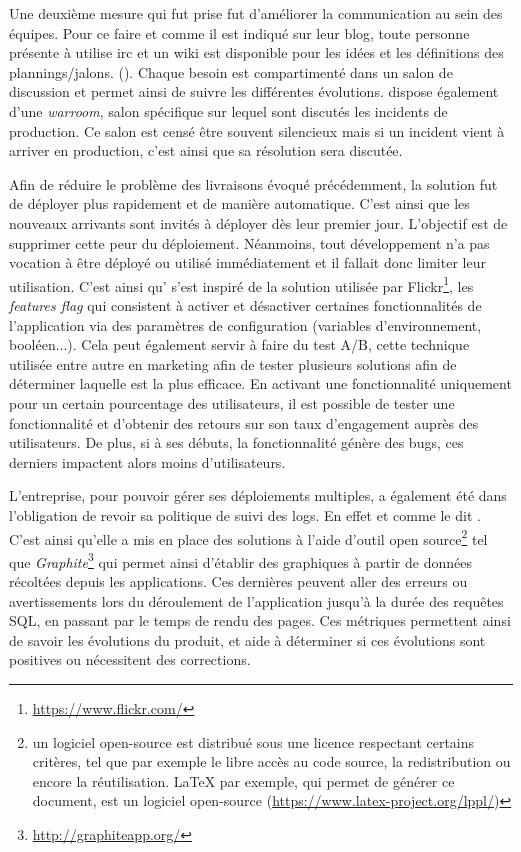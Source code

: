 Une deuxième mesure qui fut prise fut d'améliorer la communication au sein des équipes. Pour ce faire et comme il est indiqué sur leur blog, toute personne présente à \etsy{} utilise \gls{irc} et un wiki est disponible pour les idées et les définitions des plannings/jalons. (). Chaque besoin est compartimenté dans un salon de discussion et permet ainsi de suivre les différentes évolutions. \etsy{} dispose également d'une \emph{warroom}, salon spécifique sur lequel sont discutés les incidents de production. Ce salon est censé être souvent silencieux mais si un incident vient à arriver en production, c'est ainsi que sa résolution sera discutée.

Afin de réduire le problème des livraisons évoqué précédemment, la solution fut de déployer plus rapidement et de manière automatique. C'est ainsi que les nouveaux arrivants sont invités à déployer dès leur premier jour. L'objectif est de supprimer cette peur du déploiement. Néanmoins, tout développement n'a pas vocation à être déployé ou utilisé immédiatement et il fallait donc limiter leur utilisation. C'est ainsi qu'\etsy{} s'est inspiré de la solution utilisée par Flickr\footnote{\url{https://www.flickr.com/}}, les \emph{features flag} qui consistent à activer et désactiver certaines fonctionnalités de l'application via des paramètres de configuration (variables d'environnement, booléen...). Cela peut également servir à faire du test A/B, cette technique utilisée entre autre en marketing afin de tester plusieurs solutions afin de déterminer laquelle est la plus efficace. En activant une fonctionnalité uniquement pour un certain pourcentage des utilisateurs, il est possible de tester une fonctionnalité et d'obtenir des retours sur son taux d'engagement auprès des utilisateurs. De plus, si à ses débuts, la fonctionnalité génère des bugs, ces derniers impactent alors moins d'utilisateurs.

L'entreprise, pour pouvoir gérer ses déploiements multiples, a également été dans l'obligation de revoir sa politique de suivi des logs. En effet et comme \etsy{} le dit . C'est ainsi qu'elle a mis en place des solutions à l'aide d'outil open source\footnote{un logiciel open-source est distribué sous une licence respectant certains critères, tel que par exemple le libre accès au code source, la redistribution ou encore la réutilisation. \LaTeX{} par exemple, qui permet de générer ce document, est un logiciel open-source (\url{https://www.latex-project.org/lppl/})} tel que \emph{Graphite}\footnote{\url{http://graphiteapp.org/}} qui permet ainsi d'établir des graphiques à partir de données récoltées depuis les applications. Ces dernières peuvent aller des erreurs ou avertissements lors du déroulement de l'application jusqu'à la durée des requêtes \gls{SQL}, en passant par le temps de rendu des pages. Ces métriques permettent ainsi de savoir les évolutions du produit, et aide à déterminer si ces évolutions sont positives ou nécessitent des corrections.

